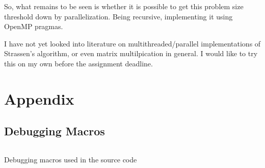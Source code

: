 \documentclass[a4paper]{article}
\newenvironment{code}{\captionsetup{type=listing}}{}
\begin{document}
So, what remains to be seen is whether it is possible to
get this problem size threshold down by parallelization.
Being recursive, implementing it using OpenMP pragmas.

I have not yet looked into literature on multithreaded/parallel
implementations of Strassen's algorithm, or even matrix
multilpication in general. I would like to try this on my
own before the assignment deadline.


\section*{Appendix}
\subsection*{Debugging Macros}
\begin{code}
\inputminted[samepage=false, breaklines, linenos]{c}{../include/dbg.h}
\label{lst:dbg_h}
\caption{Debugging macros used in the source code}
\end{code}      

   
\end{document}
